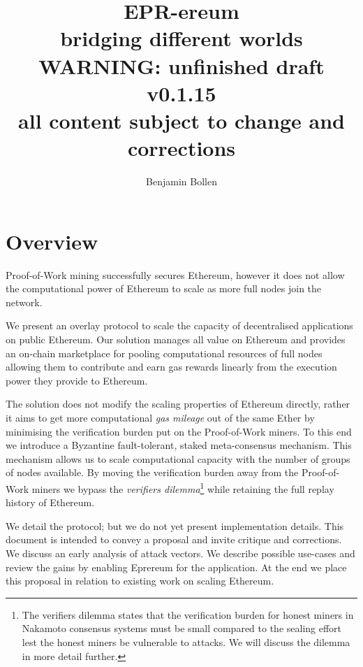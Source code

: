 \documentclass[twocolumn]{article}
\begin{document}
\title{EPR-ereum \\ bridging different worlds \\ \textbf{WARNING: unfinished draft v0.1.15 \\ all content subject to change and corrections}}
\author{Benjamin Bollen}
\maketitle
\section*{Overview}
Proof-of-Work mining successfully secures Ethereum, however it does not allow the computational power of Ethereum to scale as more full nodes join the network.

We present an overlay protocol to scale the capacity of decentralised applications on public Ethereum. Our solution manages all value on Ethereum and provides an on-chain marketplace for pooling computational resources of full nodes allowing them to contribute and earn gas rewards linearly from the execution power they provide to Ethereum.

The solution does not modify the scaling properties of Ethereum directly, rather it aims to get more computational \emph{gas mileage} out of the same Ether by minimising the verification burden put on the Proof-of-Work miners.  To this end we introduce a Byzantine fault-tolerant, staked meta-consensus mechanism. This mechanism allows us to scale computational capacity with the number of groups of nodes available.  By moving the verification burden away from the Proof-of-Work miners we bypass the \emph{verifiers dilemma}\footnote{The verifiers dilemma states that the verification burden for honest miners in Nakamoto consensus systems must be small compared to the sealing effort lest the honest miners be vulnerable to attacks. We will discuss the dilemma in more detail further.} while retaining the full replay history of Ethereum.

We detail the protocol; but we do not yet present implementation details.  This document is intended to convey a proposal and invite critique and corrections.  We discuss an early analysis of attack vectors. We describe possible use-cases and review the gains by enabling Eprereum for the application. At the end we place this proposal in relation to existing work on scaling Ethereum.
\end{document}
